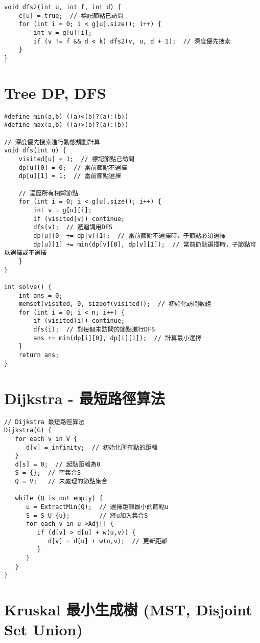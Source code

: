 \documentclass{article}
\begin{document}
\begin{multicols}{2}
\begin{lstlisting}
void dfs2(int u, int f, int d) {
    c[u] = true;  // 標記節點已訪問
    for (int i = 0; i < g[u].size(); i++) {
        int v = g[u][i];
        if (v != f && d < k) dfs2(v, u, d + 1);  // 深度優先搜索
    }
}
\end{lstlisting}

\section{Tree DP, DFS}

\begin{lstlisting}
#define min(a,b) ((a)<(b)?(a):(b))
#define max(a,b) ((a)>(b)?(a):(b))

// 深度優先搜索進行動態規劃計算
void dfs(int u) {
    visited[u] = 1;  // 標記節點已訪問
    dp[u][0] = 0;  // 當前節點不選擇
    dp[u][1] = 1;  // 當前節點選擇

    // 遍歷所有相鄰節點
    for (int i = 0; i < g[u].size(); i++) {
        int v = g[u][i];
        if (visited[v]) continue;
        dfs(v);  // 遞迴調用DFS
        dp[u][0] += dp[v][1];  // 當前節點不選擇時，子節點必須選擇
        dp[u][1] += min(dp[v][0], dp[v][1]);  // 當前節點選擇時，子節點可以選擇或不選擇
    }
}

int solve() {
    int ans = 0;
    memset(visited, 0, sizeof(visited));  // 初始化訪問數組
    for (int i = 0; i < n; i++) {
        if (visited[i]) continue;
        dfs(i);  // 對每個未訪問的節點進行DFS
        ans += min(dp[i][0], dp[i][1]);  // 計算最小選擇
    }
    return ans;
}
\end{lstlisting}

\section{Dijkstra - 最短路徑算法}

\begin{lstlisting}
// Dijkstra 最短路徑算法
Dijkstra(G) {
   for each v in V {
      d[v] = infinity;  // 初始化所有點的距離
   }
   d[s] = 0;  // 起點距離為0
   S = {};  // 空集合S
   Q = V;   // 未處理的節點集合

   while (Q is not empty) {
      u = ExtractMin(Q);  // 選擇距離最小的節點u
      S = S U {u};        // 將u加入集合S
      for each v in u->Adj[] {
         if (d[v] > d[u] + w(u,v)) {
            d[v] = d[u] + w(u,v);  // 更新距離
         }
      }
   }
}
\end{lstlisting}

\section{Kruskal 最小生成樹 (MST, Disjoint Set Union)}


\end{multicols}
\end{document}
